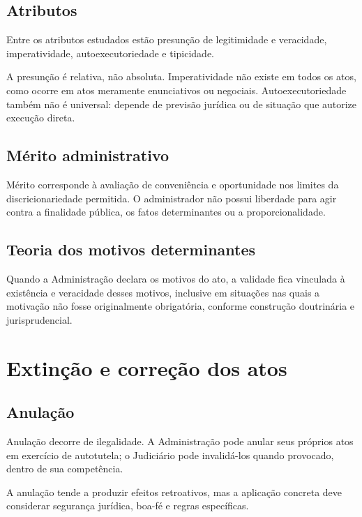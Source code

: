 \subsection{Atributos}

Entre os atributos estudados estão presunção de legitimidade e veracidade, imperatividade, autoexecutoriedade e tipicidade.

A presunção é relativa, não absoluta. Imperatividade não existe em todos os atos, como ocorre em atos meramente enunciativos ou negociais. Autoexecutoriedade também não é universal: depende de previsão jurídica ou de situação que autorize execução direta.

\subsection{Mérito administrativo}

Mérito corresponde à avaliação de conveniência e oportunidade nos limites da discricionariedade permitida. O administrador não possui liberdade para agir contra a finalidade pública, os fatos determinantes ou a proporcionalidade.

\subsection{Teoria dos motivos determinantes}

Quando a Administração declara os motivos do ato, a validade fica vinculada à existência e veracidade desses motivos, inclusive em situações nas quais a motivação não fosse originalmente obrigatória, conforme construção doutrinária e jurisprudencial.

\section{Extinção e correção dos atos}

\subsection{Anulação}

Anulação decorre de ilegalidade. A Administração pode anular seus próprios atos em exercício de autotutela; o Judiciário pode invalidá-los quando provocado, dentro de sua competência.

A anulação tende a produzir efeitos retroativos, mas a aplicação concreta deve considerar segurança jurídica, boa-fé e regras específicas.

